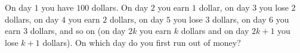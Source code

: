 On day $1$ you have $100$ dollars. On day $2$ you earn $1$ dollar, on day $3$ you lose $2$ dollars, on day $4$ you earn $2$ dollars, on day $5$ you lose $3$ dollars, on day $6$ you earn $3$ dollars, and so on (on day $2k$ you earn $k$ dollars and on day $2k+1$ you lose $k+1$ dollars). On which day do you first run out of money?
